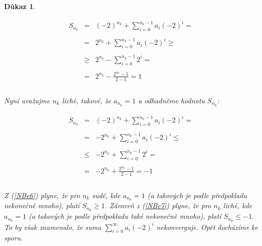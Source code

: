 \documentclass[12pt]{book}
\newtheorem*{dukaz}{Důkaz}
\begin{document}
\begin{dukaz}
\begin{itemize}
                    \begin{equation}\label{NBe6}
                    \begin{array}{rcl}
                      S_{n_k} & = & (-2)^{n_k} + \sum_{i=0}^{n_k-1}a_i(-2)^i = \\
                       &  & \\
                              & = & 2^{n_k} + \sum_{i=0}^{n_k-1}a_i(-2)^i \geq \\
                       &  & \\
                              & \geq & 2^{n_k} - \sum_{i=0}^{n_k-1}2^i = \\
                       &  & \\
                              & =    & \displaystyle{2^{n_k} - \frac{2^{n_k} - 1}{2-1} = 1}\\
                       &  & \\
                    \end{array}
                    \end{equation}


                    Nyní uvažujme $n_k$ liché, takové, že $a_{n_k} = 1$ a odhadněme hodnotu $S_{n_k}$:

                    \begin{equation}\label{NBe7}
                    \begin{array}{rcl}
                      S_{n_k} & = & (-2)^{n_k} + \sum_{i=0}^{n_k-1}a_i(-2)^i = \\
                       &  & \\
                              & = &  - 2^{n_k} + \sum_{i=0}^{n_k-1}a_i(-2)^i \leq \\
                       &  & \\
                              & \leq & - 2^{n_k} + \sum_{i=0}^{n_k-1}2^i = \\
                       &  & \\
                              & =    &\displaystyle{ - 2^{n_k} + \frac{2^{n_k} - 1}{2-1} = -1}\\
                       &  & \\
                    \end{array}
                    \end{equation}

       Z (\ref{NBe6}) plyne, že pro $n_k$ sudé, kde $a_{n_k} = 1$ (a takových je podle předpokladu nekonečně mnoho), platí $S_{n_k} \geq 1$. Zároveň z (\ref{NBe7}) plyne, že pro $n_k$ liché, kde $a_{n_k} = 1$ (a takových je podle předpokladu také nekonečně mnoho), platí $S_{n_k} \leq -1$. To by však znamenalo, že suma $\sum_{i=0}^{\infty}a_i(-2)^i$ nekonverguje. Opět docházíme ke sporu.

\end{itemize}
	
\end{dukaz}
\end{document}
